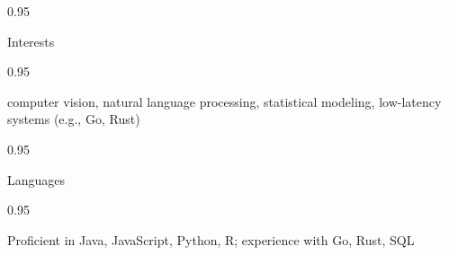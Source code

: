 \documentclass[a4paper,9pt]{article}
\newcommand{\doubleColumnGap}{\hspace{4mm}}
\newcommand{\withinSectionMarginBetween}{\vspace{-2.75ex}}
\newcommand{\mainLineSpacing}{0.95}
\begin{document}
\begin{minipage}[t]{0.20\linewidth}
  \begin{small}
    \begin{spacing}\mainLineSpacing{}
      \begin{flushright}
        Interests
      \end{flushright}
    \end{spacing}
  \end{small}
\end{minipage}
\doubleColumnGap{}
\begin{minipage}[t]{0.75\linewidth}
  \begin{small}
    \begin{spacing}\mainLineSpacing{}
      \begin{flushleft}
        computer vision, natural language processing, statistical modeling, low-latency systems (e.g., Go, Rust)
      \end{flushleft}
    \end{spacing}
  \end{small}
\end{minipage}

\withinSectionMarginBetween{}

\begin{minipage}[t]{0.20\linewidth}
  \begin{small}
    \begin{spacing}\mainLineSpacing{}
      \begin{flushright}
        Languages
      \end{flushright}
    \end{spacing}
  \end{small}
\end{minipage}
\doubleColumnGap{}
\begin{minipage}[t]{0.75\linewidth}
  \begin{small}
    \begin{spacing}\mainLineSpacing{}
      \begin{flushleft}
        Proficient in Java, JavaScript, Python, R; experience with Go, Rust, SQL
      \end{flushleft}
    \end{spacing}
  \end{small}
\end{minipage}
\end{document}
